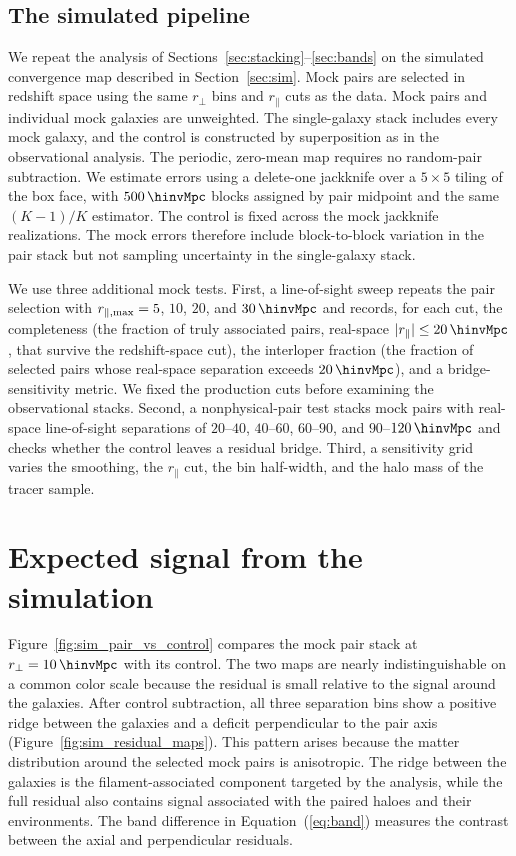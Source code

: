 \subsection{The simulated pipeline}
\label{sec:sim_pipeline}

We repeat the analysis of Sections~\ref{sec:stacking}--\ref{sec:bands} on the
simulated convergence map described in Section~\ref{sec:sim}. Mock pairs are
selected in redshift space using the same $r_{\perp}$ bins and
$r_{\parallel}$ cuts as the data. Mock pairs and individual mock galaxies
are unweighted. The single-galaxy stack includes every mock galaxy, and the
control is constructed by superposition as in the observational analysis.
The periodic, zero-mean map requires no random-pair subtraction. We estimate
errors using a delete-one jackknife over a $5\times5$ tiling of the box face,
with $500\,\hinvMpc$ blocks assigned by pair midpoint and the same $(K-1)/K$
estimator. The control is fixed across the mock jackknife realizations. The
mock errors therefore include block-to-block variation in the pair stack but
not sampling uncertainty in the single-galaxy stack.

We use three additional mock tests. First, a line-of-sight sweep repeats
the pair selection with $r_{\parallel,{\rm max}}=5$, $10$, $20$, and
$30\,\hinvMpc$ and records, for each cut, the completeness (the fraction of
truly associated pairs, real-space $|r_{\parallel}|\leq20\,\hinvMpc$, that
survive the redshift-space cut), the interloper fraction (the fraction of
selected pairs whose real-space separation exceeds $20\,\hinvMpc$), and a
bridge-sensitivity metric. We fixed the production cuts before examining the
observational stacks.
Second, a nonphysical-pair test stacks mock pairs with real-space
line-of-sight separations of $20$--$40$, $40$--$60$, $60$--$90$, and
$90$--$120\,\hinvMpc$ and checks whether the control leaves a residual bridge.
Third, a sensitivity grid varies the smoothing, the $r_{\parallel}$ cut, the
bin half-width, and the halo mass of the tracer sample.

\section{Expected signal from the simulation}
\label{sec:sim_expect}

Figure~\ref{fig:sim_pair_vs_control} compares the mock pair stack at
$r_{\perp}=10\,\hinvMpc$ with its control. The two maps are nearly
indistinguishable on a common color scale because the residual is small
relative to the signal around the galaxies. After control subtraction, all
three separation bins show a positive ridge between the galaxies and a
deficit perpendicular to the pair axis (Figure~\ref{fig:sim_residual_maps}).
This pattern arises because the matter distribution around the selected mock
pairs is anisotropic. The ridge between the galaxies is the
filament-associated component targeted by the analysis, while the full
residual also contains signal associated with the paired haloes and their
environments. The band difference in Equation~(\ref{eq:band}) measures the
contrast between the axial and perpendicular residuals.

